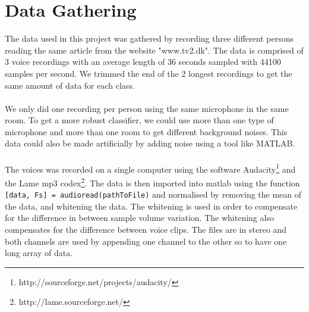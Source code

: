 
\section{Data Gathering}
The data used in this project was gathered by recording three different persons reading the same article from the website "www.tv2.dk".
The data is comprised of 3 voice recordings with an average length of 36 seconds sampled with 44100 samples per second.
We trimmed the end of the 2 longest recordings to get the same amount of data for each class.
\\\ \\
We only did one recording per person using the same microphone in the same room.
To get a more robust classifier, we could use more than one type of microphone and more than one room to get different background noises.
This data could also be made artificially by adding noise using a tool like MATLAB.
\\\ \\
The voices was recorded on a single computer using the software Audacity\footnote{http://sourceforge.net/projects/audacity/} and the Lame mp3 codex\footnote{http://lame.sourceforge.net/}.
The data is then imported into matlab using the function \texttt{[data, Fs] = audioread(pathToFile)} and normalised by removing the mean of the data, and whitening the data.
The whitening is used in order to compensate for the difference in between sample volume variation. The whitening also compensates for the difference between voice clips.
The files are in stereo and both channels are used by appending one channel to the other so to have one long array of data.

